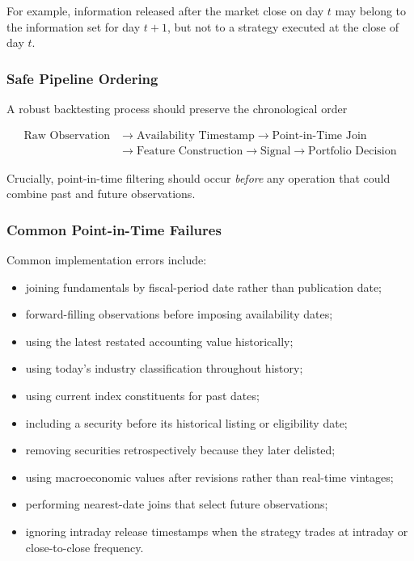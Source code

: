 \documentclass[11pt,a4paper]{article}
\begin{document}
For example, information released after the market close on day $t$ may belong
to the information set for day $t+1$, but not to a strategy executed at the
close of day $t$.


\subsubsection{Safe Pipeline Ordering}

A robust backtesting process should preserve the chronological order

\begin{equation}
\boxed{
\begin{aligned}
\text{Raw Observation}
&\rightarrow
\text{Availability Timestamp}
\rightarrow
\text{Point-in-Time Join}
\\[0.15cm]
&\rightarrow
\text{Feature Construction}
\rightarrow
\text{Signal}
\rightarrow
\text{Portfolio Decision}
\end{aligned}
}
\end{equation}

Crucially, point-in-time filtering should occur \emph{before} any operation
that could combine past and future observations.


\subsubsection{Common Point-in-Time Failures}

Common implementation errors include:

\begin{itemize}
    \item joining fundamentals by fiscal-period date rather than publication
    date;

    \item forward-filling observations before imposing availability dates;

    \item using the latest restated accounting value historically;

    \item using today's industry classification throughout history;

    \item using current index constituents for past dates;

    \item including a security before its historical listing or eligibility
    date;

    \item removing securities retrospectively because they later delisted;

    \item using macroeconomic values after revisions rather than real-time
    vintages;

    \item performing nearest-date joins that select future observations;

    \item ignoring intraday release timestamps when the strategy trades at
    intraday or close-to-close frequency.
\end{itemize}
\end{document}
